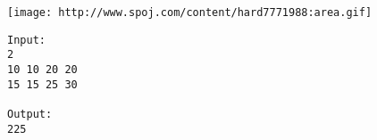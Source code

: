 \texttt{[image: http://www.spoj.com/content/hard7771988:area.gif]}
\begin{verbatim}
Input:
2
10 10 20 20
15 15 25 30

Output:
225 

\end{verbatim}
